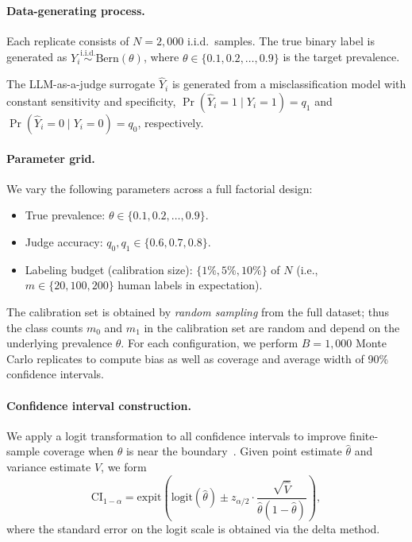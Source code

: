\documentclass[11pt]{article}
\newcommand{\1}{\mathbf{1}}
\theoremstyle{remark}
\begin{document}
  \paragraph{Data-generating process.}
  Each replicate consists of $N = 2{,}000$ i.i.d.\ samples.
  The true binary label is generated as 
  $Y_i \stackrel{\text{i.i.d.}}{\sim} \mathrm{Bern}(\theta)$,
  where $\theta \in \{0.1, 0.2, \ldots, 0.9\}$ is the target prevalence.

The LLM-as-a-judge surrogate $\widehat Y_i$ is generated from a misclassification
model with constant sensitivity and specificity,
$\Pr(\widehat Y_i = 1 \mid Y_i = 1) = q_1$ and
$\Pr(\widehat Y_i = 0 \mid Y_i = 0) = q_0$, respectively.


  \paragraph{Parameter grid.}
  We vary the following parameters across a full factorial design:
  \begin{itemize}
      \item True prevalence: $\theta \in \{0.1, 0.2, \ldots, 0.9\}$.
      \item Judge accuracy: $q_0, q_1 \in \{0.6, 0.7, 0.8\}$.
      \item Labeling budget (calibration size): $\{1\%, 5\%, 10\%\}$ of $N$
            (i.e., $m \in \{20, 100, 200\}$ human labels in expectation).
  \end{itemize}
  The calibration set is obtained by \emph{random sampling} from the full dataset; thus the class counts
  $m_0$ and $m_1$ in the calibration set are random and depend on the underlying prevalence $\theta$.
  For each configuration, we perform $B = 1{,}000$ Monte Carlo replicates to compute bias as well as coverage and average width of 90\% confidence intervals. 

  \paragraph{Confidence interval construction.}
  We apply a logit transformation to all confidence intervals to improve finite-sample coverage when $\theta$ is near the boundary~\citep{brown2001interval,stone1996course}. Given point estimate $\hat\theta$ and variance estimate $\widehat V$, we form
  \[
  \mathrm{CI}_{1-\alpha} = \mathrm{expit}\!\left(
    \mathrm{logit}(\hat\theta) \pm z_{\alpha/2} \cdot \frac{\sqrt{\widehat V}}{\hat\theta(1 - \hat\theta)}
  \right),
  \]
  where the standard error on the logit scale is obtained via the delta method.  
\end{document}
